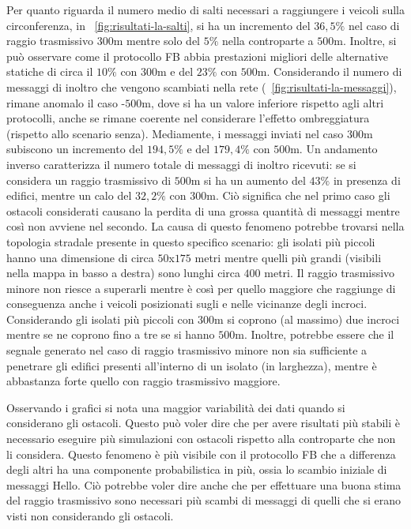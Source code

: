 Per quanto riguarda il numero medio di salti necessari a raggiungere i veicoli sulla circonferenza,
in \figurename~\ref{fig:risultati-la-salti},
si ha un incremento del $36,5\%$ nel caso di raggio trasmissivo $300$m mentre solo del $5\%$ nella controparte a $500$m.
Inoltre, si può osservare come il protocollo FB abbia prestazioni migliori delle alternative statiche
di circa il $10\%$ con $300$m e del $23\%$ con $500$m. %
Considerando il numero di messaggi di inoltro che vengono scambiati nella rete (\figurename~\ref{fig:risultati-la-messaggi}),
rimane anomalo il caso \statica{}-$500$m, dove si ha un valore inferiore rispetto agli altri protocolli,
anche se rimane coerente nel considerare l'effetto ombreggiatura (rispetto allo scenario senza).
Mediamente, i messaggi inviati nel caso $300$m subiscono un incremento del $194,5\%$ e del $179,4\%$
con $500$m.
Un andamento inverso caratterizza il numero totale di messaggi di inoltro ricevuti:
se si considera un raggio trasmissivo di $500$m si ha un aumento del $43\%$ in presenza di edifici,
mentre un calo del $32,2\%$ con $300$m.
Ciò significa che nel primo caso gli ostacoli considerati causano la perdita di una grossa quantità di messaggi
mentre così non avviene nel secondo.
La causa di questo fenomeno potrebbe trovarsi nella topologia stradale presente in questo specifico scenario:
gli isolati più piccoli hanno una dimensione di circa $50$x$175$ metri mentre quelli più grandi
(visibili nella mappa in basso a destra) sono lunghi circa $400$ metri.
Il raggio trasmissivo minore non riesce a superarli mentre è così per quello maggiore che raggiunge
di conseguenza anche i veicoli posizionati sugli e nelle vicinanze degli incroci.
Considerando gli isolati più piccoli con $300$m si coprono (al massimo) due incroci mentre se ne coprono
fino a tre se si hanno $500$m.
Inoltre, potrebbe essere che il segnale generato nel caso di raggio trasmissivo minore
non sia sufficiente a penetrare gli edifici presenti all'interno di un isolato (in larghezza),
mentre è abbastanza forte quello con raggio trasmissivo maggiore.

Osservando i grafici si nota una maggior variabilità dei dati quando si considerano gli ostacoli.
Questo può voler dire che per avere risultati più stabili è necessario eseguire più simulazioni
con ostacoli rispetto alla controparte che non li considera.
Questo fenomeno è più visibile con il protocollo FB che a differenza degli altri
ha una componente probabilistica in più, ossia lo scambio iniziale di messaggi Hello.
Ciò potrebbe voler dire anche che per effettuare una buona stima del raggio trasmissivo
sono necessari più scambi di messaggi di quelli che si erano visti non considerando gli ostacoli. %

